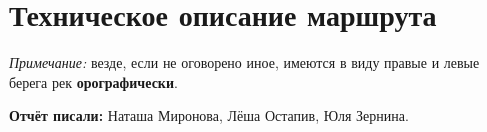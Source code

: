 \section{Техническое описание маршрута}
\textit{Примечание:} везде, если не оговорено иное, имеются в виду правые и левые берега рек \textbf{орографически}.

\textbf{Отчёт писали:} Наташа Миронова, Лёша Остапив, Юля Зернина.






